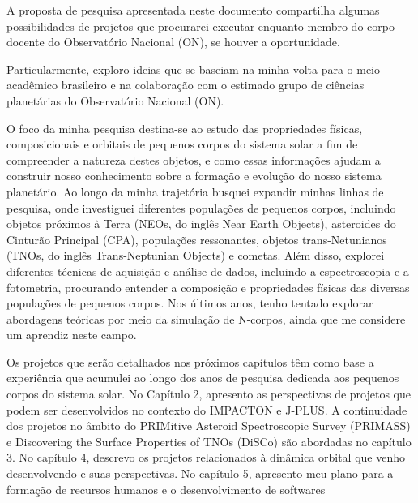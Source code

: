 \documentclass[10pt,a4paper,oneside]{book}
\begin{document}
A proposta de pesquisa apresentada neste documento compartilha algumas possibilidades de projetos que procurarei executar enquanto membro do corpo docente
do Observatório Nacional (ON), se houver a oportunidade. 

Particularmente, exploro ideias
que se baseiam na minha volta para o meio acadêmico brasileiro e na colaboração com o
estimado grupo de ciências planetárias do Observatório Nacional (ON). 


O foco da minha pesquisa destina-se ao estudo das propriedades físicas, composicionais
e orbitais de pequenos corpos do sistema solar a fim de compreender a natureza destes
objetos, e como essas informações ajudam a construir nosso conhecimento sobre a formação
e evolução do nosso sistema planetário. Ao longo da minha trajetória busquei expandir
minhas linhas de pesquisa, onde investiguei diferentes populações de pequenos corpos,
incluindo objetos próximos à Terra (NEOs, do inglês Near Earth Objects), asteroides do
Cinturão Principal (CPA), populações ressonantes, objetos trans-Netunianos (TNOs, do inglês
Trans-Neptunian Objects) e cometas. Além disso, explorei diferentes técnicas de aquisição
e análise de dados, incluindo a espectroscopia e a fotometria, procurando entender a
composição e propriedades físicas das diversas populações de pequenos corpos. Nos últimos
anos, tenho tentado explorar abordagens teóricas por meio da simulação de N-corpos, ainda
que me considere um aprendiz neste campo.


Os projetos que serão detalhados nos próximos capítulos têm como base a experiência
que acumulei ao longo dos anos de pesquisa dedicada aos pequenos corpos do sistema
solar. No Capítulo 2, apresento as perspectivas de projetos que podem ser desenvolvidos
no contexto do IMPACTON e J-PLUS. A continuidade dos projetos no âmbito do PRIMitive
Asteroid Spectroscopic Survey (PRIMASS) e Discovering the Surface Properties of TNOs (DiSCo)
são abordadas no capítulo 3. No capítulo 4, descrevo os projetos relacionados à dinâmica
orbital que venho desenvolvendo e suas perspectivas. No capítulo 5, apresento meu plano
para a formação de recursos humanos e o desenvolvimento de softwares
\end{document}
